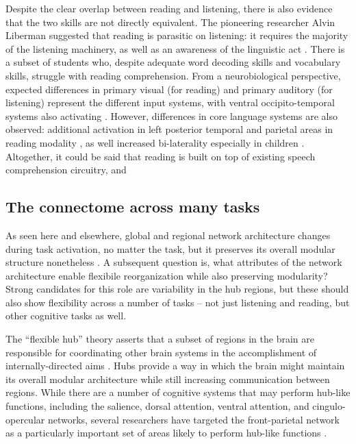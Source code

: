Despite the clear overlap between reading and listening, there is also evidence that the two skills are not directly equivalent. The pioneering researcher Alvin Liberman suggested that reading is parasitic on listening: it requires the majority of the listening machinery, as well as an awareness of the linguistic act \citep{Mattingly1971}. There is a subset of students who, despite adequate word decoding skills and vocabulary skills, struggle with reading comprehension\citep{Pimperton2010, Spencer2014}. From a neurobiological perspective, expected differences in primary visual (for reading) and primary auditory (for listening) represent the different input systems, with ventral occipito-temporal systems also activating \citep{Jobard2007}. However, differences in core language systems are also observed: additional activation in left posterior temporal and parietal areas in reading modality \citep{Constable2004}, as well increased bi-laterality especially in children \citep{Berl2011}. Altogether, it could be said that reading is built on top of existing speech comprehension circuitry, and 

\subsection{The connectome across many tasks}

As seen here and elsewhere, global and regional network architecture changes during task activation, no matter the task, but it preserves its overall modular structure nonetheless \citep{Cole2014}. A subsequent question is, what attributes of the network architecture enable flexibile reorganization while also preserving modularity? Strong candidates for this role are variability in the hub regions, but these should also show flexibility across a number of tasks -- not just listening and reading, but other cognitive tasks as well. 

The ``flexible hub'' theory asserts that a subset of regions in the brain are responsible for coordinating other brain systems in the accomplishment of internally-directed aims \citep{Cole2007}. Hubs provide a way in which the brain might maintain its overall modular architecture while still increasing communication between regions. While there are a number of cognitive systems that may perform hub-like functions, including the salience, dorsal attention, ventral attention, and cingulo-opercular networks, several researchers have targeted the front-parietal network as a particularly important set of areas likely to perform hub-like functions \citep{Cole2013, Niendam2012}. 

